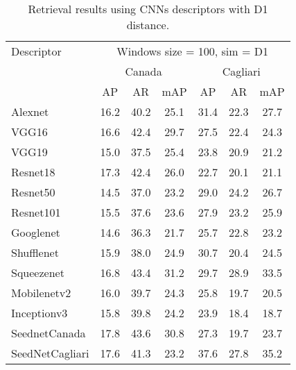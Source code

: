 \documentclass[12pt,italian]{article}
\begin{document}


\begin{table}
	\centering
	\caption{Retrieval results using CNNs descriptors with D1 distance.}
	\label{tab:retrievalD1}
	\begin{tabular}{lcccccc}
		\toprule
		Descriptor      &     \multicolumn{6}{c}{Windows size = 100, sim = D1}     \\
		                & \multicolumn{3}{c}{Canada} & \multicolumn{3}{c}{Cagliari} \\
		                &  AP  &  AR  &     mAP      &  AP  &  AR  &      mAP       \\ \midrule
		Alexnet         & 16.2 & 40.2 &     25.1     & 31.4 & 22.3 &      27.7      \\
		VGG16           & 16.6 & 42.4 &     29.7     & 27.5 & 22.4 &      24.3      \\
		VGG19           & 15.0 & 37.5 &     25.4     & 23.8 & 20.9 &      21.2      \\
		Resnet18        & 17.3 & 42.4 &     26.0     & 22.7 & 20.1 &      21.1      \\
		Resnet50        & 14.5 & 37.0 &     23.2     & 29.0 & 24.2 &      26.7      \\
		Resnet101       & 15.5 & 37.6 &     23.6     & 27.9 & 23.2 &      25.9      \\
		Googlenet       & 14.6 & 36.3 &     21.7     & 25.7 & 22.8 &      23.2      \\
		Shufflenet      & 15.9 & 38.0 &     24.9     & 30.7 & 20.4 &      24.5      \\
		Squeezenet      & 16.8 & 43.4 &     31.2     & 29.7 & 28.9 &      33.5      \\
		Mobilenetv2     & 16.0 & 39.7 &     24.3     & 25.8 & 19.7 &      20.5      \\
		Inceptionv3     & 15.8 & 39.8 &     24.2     & 23.9 & 18.4 &      18.7      \\
		SeednetCanada   & 17.8 & 43.6 &     30.8     & 27.3 & 19.7 &      23.7      \\
		SeedNetCagliari & 17.6 & 41.3 &     23.2     & 37.6 & 27.8 &      35.2      \\ \bottomrule
	\end{tabular}
\end{table}

 \pagebreak 
\end{document}
